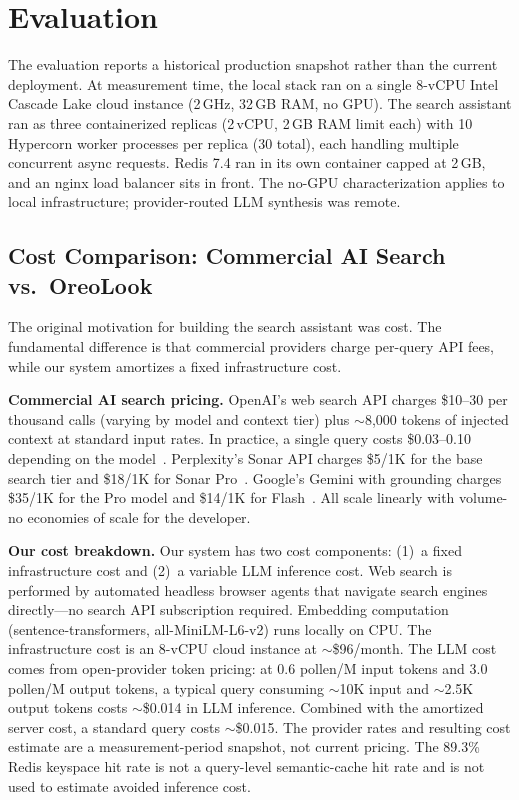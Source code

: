 \documentclass[conference]{IEEEtran}
\begin{document}
\section{Evaluation}
\label{sec:evaluation}

The evaluation reports a historical production snapshot rather than the current deployment. At measurement time, the local stack ran on a single 8-vCPU Intel Cascade Lake cloud instance (2\,GHz, 32\,GB RAM, no GPU). The search assistant ran as three containerized replicas (2\,vCPU, 2\,GB RAM limit each) with 10 Hypercorn worker processes per replica (30 total), each handling multiple concurrent async requests. Redis 7.4 ran in its own container capped at 2\,GB, and an nginx load balancer sits in front. The no-GPU characterization applies to local infrastructure; provider-routed LLM synthesis was remote.

\subsection{Cost Comparison: Commercial AI Search vs.\ OreoLook}

The original motivation for building the search assistant was cost. The fundamental difference is that commercial providers charge per-query API fees, while our system amortizes a fixed infrastructure cost.

\textbf{Commercial AI search pricing.} OpenAI's web search API charges \$10--30 per thousand calls (varying by model and context tier) plus ${\sim}$8{,}000 tokens of injected context at standard input rates. In practice, a single query costs \$0.03--0.10 depending on the model~\cite{openai_search_pricing, openai_search_billing}. Perplexity's Sonar API charges \$5/1K for the base search tier and \$18/1K for Sonar Pro~\cite{perplexity_pricing}. Google's Gemini with grounding charges \$35/1K for the Pro model and \$14/1K for Flash~\cite{google_grounding_pricing}. All scale linearly with volume-no economies of scale for the developer.

\textbf{Our cost breakdown.} Our system has two cost components: (1)~a fixed infrastructure cost and (2)~a variable LLM inference cost. Web search is performed by automated headless browser agents that navigate search engines directly---no search API subscription required. Embedding computation (sentence-transformers, all-MiniLM-L6-v2) runs locally on CPU. The infrastructure cost is an 8-vCPU cloud instance at ${\sim}$\$96/month. The LLM cost comes from open-provider token pricing: at 0.6 pollen/M input tokens and 3.0 pollen/M output tokens, a typical query consuming ${\sim}$10K input and ${\sim}$2.5K output tokens costs ${\sim}$\$0.014 in LLM inference. Combined with the amortized server cost, a standard query costs ${\sim}$\$0.015. The provider rates and resulting cost estimate are a measurement-period snapshot, not current pricing. The 89.3\% Redis keyspace hit rate is not a query-level semantic-cache hit rate and is not used to estimate avoided inference cost.
\end{document}
